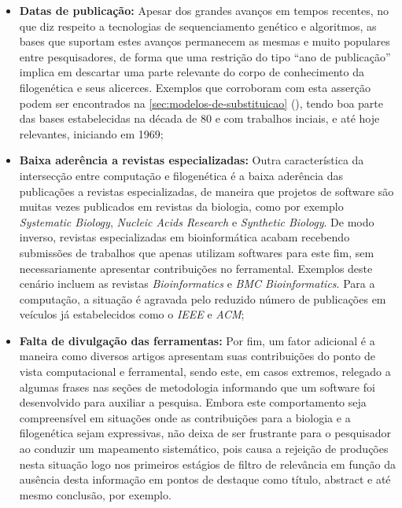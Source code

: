 \documentclass[english,brazilian]{UNISINOSmonografia} %
\begin{document}
\begin{itemize}
	
	\item \textbf{Datas de publicação:}
	Apesar dos grandes avanços em tempos recentes, no que diz respeito a tecnologias de sequenciamento genético e algoritmos, as bases que suportam estes avanços permanecem as mesmas e muito populares entre pesquisadores, de forma que uma restrição do tipo ``ano de publicação'' implica em descartar uma parte relevante do corpo de conhecimento da filogenética e seus alicerces.
	Exemplos que corroboram com esta asserção podem ser encontrados na \autoref{sec:modelos-de-substituicao} (), tendo boa parte das bases estabelecidas na década de 80 e com trabalhos inciais, e até hoje relevantes, iniciando em 1969;
	
	\item \textbf{Baixa aderência a revistas especializadas:}
	Outra característica da intersecção entre computação e filogenética é a baixa aderência das publicações a revistas especializadas, de maneira que projetos de software são muitas vezes publicados em revistas da biologia, como por exemplo \textit{Systematic Biology}, \textit{Nucleic Acids Research} e \textit{Synthetic Biology}. 
	De modo inverso, revistas especializadas em bioinformática acabam recebendo submissões de trabalhos que apenas utilizam softwares para este fim, sem necessariamente apresentar contribuições no ferramental. Exemplos deste cenário incluem as revistas \textit{Bioinformatics} e \textit{BMC Bioinformatics}.
	Para a computação, a situação é agravada pelo reduzido número de publicações em veículos já estabelecidos como o \textit{IEEE} e \textit{ACM};
	
	\item \textbf{Falta de divulgação das ferramentas:}
	Por fim, um fator adicional é a maneira como diversos artigos apresentam suas contribuições do ponto de vista computacional e ferramental, sendo este, em casos extremos, relegado a algumas frases nas seções de metodologia informando que um software foi desenvolvido para auxiliar a pesquisa. Embora este comportamento seja compreensível em situações onde as contribuições para a biologia e a filogenética sejam expressivas, não deixa de ser frustrante para o pesquisador ao conduzir um mapeamento sistemático, pois causa a rejeição de produções nesta situação logo nos primeiros estágios de filtro de relevância em função da ausência desta informação em pontos de destaque como título, abstract e até mesmo conclusão, por exemplo.

\end{itemize}
\end{document}
